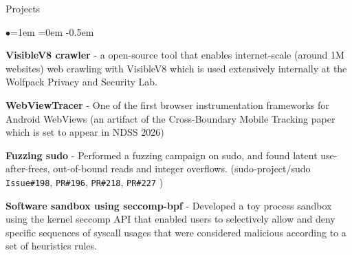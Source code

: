 \documentclass{resume} %
\begin{document}
\begin{rSection}{Projects}
\begin{list}{$\bullet$}{\leftmargin=1em \itemindent=0em}
\itemsep -0.5em
\item {\bf VisibleV8 crawler} - a open-source tool that enables internet-scale (around 1M websites) web crawling with VisibleV8 which is used extensively internally at the Wolfpack Privacy and Security Lab.
\item {\bf WebViewTracer} - One of the first browser instrumentation frameworks for Android WebViews (an artifact of the Cross-Boundary Mobile Tracking paper which is set to appear in NDSS 2026)
\item {\bf Fuzzing sudo} - Performed a fuzzing campaign on sudo, and found latent use-after-frees, out-of-bound reads and integer overflows. (sudo-project/sudo \texttt{Issue\#198}, \texttt{PR\#196}, \texttt{PR\#218}, \texttt{PR\#227} )
\item {\bf Software sandbox using seccomp-bpf} - Developed a toy process sandbox using the kernel seccomp API that enabled users to selectively allow and deny specific sequences of syscall usages that were considered malicious according to a set of heuristics rules.
\end{list}
\end{rSection}
\end{document}
